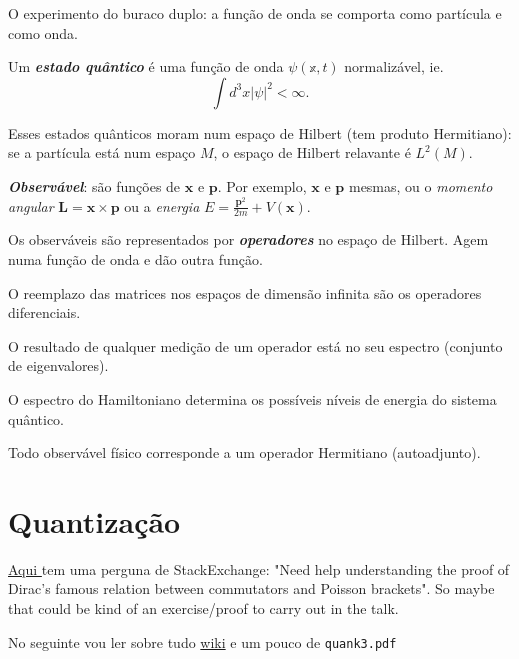 O experimento do buraco duplo: a fun\c c\~ao de onda se comporta como part\'icula e como onda.

 \begin{defn}
 	Um \textit{\textbf{estado qu\^antico}} \'e uma fun\c c\~ao de onda $\psi(\mathbb{x},t)$ normaliz\'avel, ie.
	\[\int d^3x|\psi|^2<\infty.\]
 \end{defn}
 Esses estados qu\^anticos moram num espaço de Hilbert (tem produto Hermitiano): se a part\'icula est\'a num espaço $M$, o espaço de Hilbert relavante \'e $L^2(M)$.

\begin{defn}
	\textit{\textbf{Observ\'avel}}: s\~ao fun\c c\~oes  de $\mathbf{x}$ e $\mathbf{p}$. Por exemplo, $\mathbf{x}$ e $\mathbf{p}$ mesmas, ou o \textit{momento angular} $\mathbf{L}=\mathbf{x}\times \mathbf{p}$ ou a \textit{energia} $E=\frac{\mathbf{p}^2}{2m}+V(\mathbf{x})$.

	Os observ\'aveis s\~ao representados por \textit{\textbf{operadores}} no espaço de Hilbert. Agem numa fun\c c\~ao de onda e d\~ao outra fun\c c\~ao.
\end{defn}

\begin{remark}
	O reemplazo das matrices nos espaços de dimens\~ao infinita s\~ao os operadores diferenciais.
\end{remark}

\begin{remark}
	O resultado de qualquer medi\c c\~ao de um operador est\'a no seu espectro (conjunto de eigenvalores).
\end{remark}

O espectro do Hamiltoniano determina os poss\'iveis n\'iveis de energia do sistema qu\^antico.

Todo observ\'avel f\'isico corresponde a um operador Hermitiano (autoadjunto).


\section{Quantização}

\href{https://math.stackexchange.com/questions/4540394/need-help-understanding-the-proof-of-diracs-famous-relation-between-commutators}{Aqui } tem uma perguna de StackExchange: "Need help understanding the proof of Dirac's famous relation between commutators and Poisson brackets". So maybe that could be kind of an exercise/proof to carry out in the talk.

No seguinte vou ler sobre tudo \href{https://en.wikipedia.org/wiki/Geometric_quantization}{wiki} e um pouco de  \texttt{quank3.pdf}

